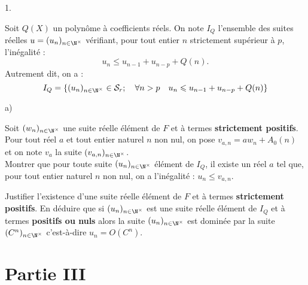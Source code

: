 \documentclass[11pt]{article}%
\begin{document}
\begin{noliste}{1.}
\item Soit $Q(X)$ un polynôme à coefficients réels. On note $I_{Q}$
l'ensemble des suites réelles $u = (u_{n})_{n\in \N^{\times }}$
vérifiant, pour tout entier $n$ strictement supérieur à $p$,
l'inégalité : 
\[
u_{n}\leq u_{n-1} + u_{n-p} + Q(n).
\]
Autrement dit, on a : 
\[
I_{Q} = \{(u_{n})_{n\in \N^{\times }}\in \mathcal{S}_{r};\quad \forall
n>p\quad u_{n}\leq u_{n-1} + u_{n-p} + Q(n)\}
\]

\begin{noliste}{a)}
 \setlength{\itemsep}{2mm}
\item Soit $(w_{n})_{n\in \N^{\times }}$ une suite réelle élément de 
$F$ et à termes \textbf{strictement positifs}. Pour tout réel $a$ et
tout
entier naturel $n$ non nul, on pose $v_{a,n} = aw_{n} + A_{0}(n)$ et on
note $v_{a}$ la suite $(v_{a,n})_{n\in \N^{\times }}$.\\
Montrer que pour toute suite $(u_{n})_{n\in \N^{\times }}$ élément
de $I_{Q}$, il existe un réel $a$ tel que, pour tout entier naturel $n$
non
nul, on a l'inégalité : $u_{n}\leq v_{a,n}$.

\item Justifier l'existence d'une suite réelle élément de $F$ et à
termes 
\textbf{strictement positifs}. En déduire que si $(u_{n})_{n\in
\N^{\times }}$ est une suite réelle élément de $I_{Q}$ et à termes
\textbf{positifs ou nuls} alors la suite $(u_{n})_{n\in \N^{\times }}$
est
dominée par la suite $(C^{n})_{n\in \N^{\times }}$ c'est-à-dire $u_{n}
= O(C^{n})$.
\end{noliste}
\end{noliste}

\section*{Partie III}
\end{document}
